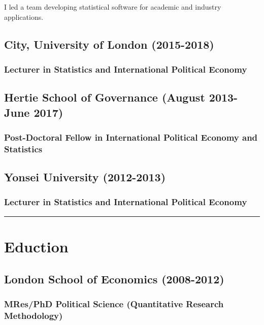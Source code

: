 \documentclass[a4paper]{article}
\begin{document}
I led a team developing statistical software for academic and industry applications. 

\subsection*{City, University of London (2015-2018)}

\subsubsection*{Lecturer in Statistics and International Political Economy}

\subsection*{Hertie School of Governance (August 2013-June 2017)}

\subsubsection*{Post-Doctoral Fellow in International Political Economy and Statistics}

\subsection*{Yonsei University (2012-2013)}
\subsubsection*{Lecturer in Statistics and International Political Economy}

\vspace{0.25cm}
\medskip\hrule height 1pt
\vspace{0.5cm}


\section*{Eduction}

\subsection*{London School of Economics (2008-2012)}
\subsubsection*{MRes/PhD Political Science (Quantitative Research Methodology)}
\end{document}
